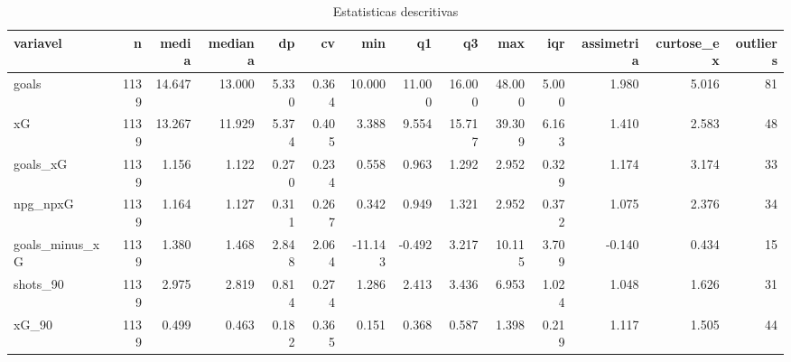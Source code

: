 \begin{table}

\caption{\label{tab:desc_g10}Estatisticas descritivas}
\centering
\begin{tabular}[t]{lrrrrrrrrrrrrr}
\toprule
variavel & n & media & mediana & dp & cv & min & q1 & q3 & max & iqr & assimetria & curtose\_ex & outliers\\
\midrule
goals & 1139 & 14.647 & 13.000 & 5.330 & 0.364 & 10.000 & 11.000 & 16.000 & 48.000 & 5.000 & 1.980 & 5.016 & 81\\
xG & 1139 & 13.267 & 11.929 & 5.374 & 0.405 & 3.388 & 9.554 & 15.717 & 39.309 & 6.163 & 1.410 & 2.583 & 48\\
goals\_xG & 1139 & 1.156 & 1.122 & 0.270 & 0.234 & 0.558 & 0.963 & 1.292 & 2.952 & 0.329 & 1.174 & 3.174 & 33\\
npg\_npxG & 1139 & 1.164 & 1.127 & 0.311 & 0.267 & 0.342 & 0.949 & 1.321 & 2.952 & 0.372 & 1.075 & 2.376 & 34\\
goals\_minus\_xG & 1139 & 1.380 & 1.468 & 2.848 & 2.064 & -11.143 & -0.492 & 3.217 & 10.115 & 3.709 & -0.140 & 0.434 & 15\\
\addlinespace
shots\_90 & 1139 & 2.975 & 2.819 & 0.814 & 0.274 & 1.286 & 2.413 & 3.436 & 6.953 & 1.024 & 1.048 & 1.626 & 31\\
xG\_90 & 1139 & 0.499 & 0.463 & 0.182 & 0.365 & 0.151 & 0.368 & 0.587 & 1.398 & 0.219 & 1.117 & 1.505 & 44\\
\bottomrule
\end{tabular}
\end{table}

